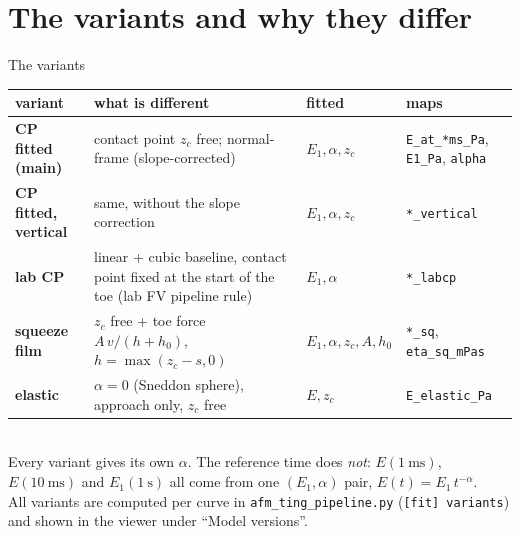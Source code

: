 \documentclass[aspectratio=169,9pt]{beamer}
\begin{document}
\section{The variants and why they differ}

\begin{frame}{The variants}
\small
\begin{tabularx}{\textwidth}{@{}l X l l@{}}
\toprule
variant & what is different & fitted & maps\\
\midrule
\textcolor{cRed}{\textbf{CP fitted (main)}} & contact point $z_c$ free; normal-frame (slope-corrected) & $E_1,\alpha,z_c$ & \texttt{E\_at\_*ms\_Pa}, \texttt{E1\_Pa}, \texttt{alpha}\\
\textcolor{cOrange}{\textbf{CP fitted, vertical}} & same, without the slope correction & $E_1,\alpha,z_c$ & \texttt{*\_vertical}\\
\textcolor{cGreen}{\textbf{lab CP}} & linear + cubic baseline, contact point fixed at the start of the toe (lab FV pipeline rule) & $E_1,\alpha$ & \texttt{*\_labcp}\\
\textcolor{cBlue}{\textbf{squeeze film}} & $z_c$ free + toe force $A\,v/(h+h_0)$, $h=\max(z_c-s,0)$ & $E_1,\alpha,z_c,A,h_0$ & \texttt{*\_sq}, \texttt{eta\_sq\_mPas}\\
\textbf{elastic} & $\alpha=0$ (Sneddon sphere), approach only, $z_c$ free & $E,z_c$ & \texttt{E\_elastic\_Pa}\\
\bottomrule
\end{tabularx}\\[6pt]
Every variant gives its own $\alpha$. The reference time does \emph{not}: $E(\SI{1}{\milli\second})$, $E(\SI{10}{\milli\second})$ and $E_1(\SI{1}{\second})$ all come from one $(E_1,\alpha)$ pair, $E(t)=E_1\,t^{-\alpha}$.\\[6pt]
All variants are computed per curve in \texttt{afm\_ting\_pipeline.py} (\texttt{[fit] variants}) and shown in the viewer under ``Model versions''.
\end{frame}
\end{document}

